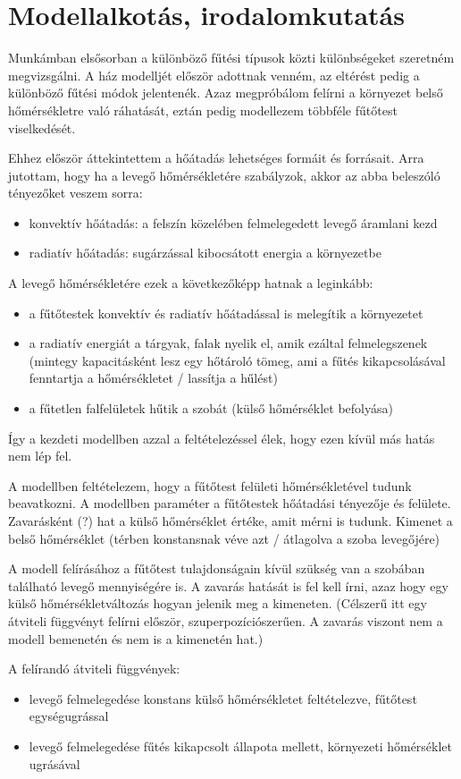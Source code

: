 \section{Modellalkotás, irodalomkutatás}

Munkámban elsősorban a különböző fűtési típusok közti különbségeket szeretném megvizsgálni. A ház modelljét először adottnak venném, az eltérést pedig a különböző fűtési módok jelentenék.
Azaz megpróbálom felírni a környezet belső hőmérsékletre való ráhatását, eztán pedig modellezem többféle fűtőtest viselkedését.

Ehhez először áttekintettem a hőátadás lehetséges formáit és forrásait. Arra jutottam, hogy ha a levegő hőmérsékletére szabályzok, akkor az abba beleszóló tényezőket veszem sorra:
\begin{itemize}[noitemsep,topsep=0pt,parsep=0pt,partopsep=0pt]
	\item konvektív hőátadás: a felszín közelében felmelegedett levegő áramlani kezd
	\item radiatív hőátadás: sugárzással kibocsátott energia a környezetbe
\end{itemize}


A levegő hőmérsékletére ezek a következőképp hatnak a leginkább:
\begin{itemize}[noitemsep,topsep=0pt,parsep=0pt,partopsep=0pt]
	\item a fűtőtestek konvektív és radiatív hőátadással is melegítik a környezetet
	\item a radiatív energiát a tárgyak, falak nyelik el, amik ezáltal felmelegszenek (mintegy kapacitásként lesz egy hőtároló tömeg, ami a fűtés kikapcsolásával fenntartja a hőmérsékletet / lassítja a hűlést)
	\item a fűtetlen falfelületek hűtik a szobát (külső hőmérséklet befolyása)
\end{itemize}

Így a kezdeti modellben azzal a feltételezéssel élek, hogy ezen kívül más hatás nem lép fel.

A modellben feltételezem, hogy a fűtőtest felületi hőmérsékletével tudunk beavatkozni. A modellben paraméter a fűtőtestek hőátadási tényezője és felülete. Zavarásként (?) hat a külső hőmérséklet értéke, amit mérni is tudunk. Kimenet a belső hőmérséklet (térben konstansnak véve azt / átlagolva a szoba levegőjére)

A modell felírásához a fűtőtest tulajdonságain kívül szükség van a szobában található levegő mennyiségére is. A zavarás hatását is fel kell írni, azaz hogy egy külső hőmérsékletváltozás hogyan jelenik meg a kimeneten. (Célszerű itt egy átviteli függvényt felírni először, szuperpozíciószerűen. A zavarás viszont nem a modell bemenetén és nem is a kimenetén hat.)

A felírandó átviteli függvények:

\begin{itemize}[noitemsep,topsep=0pt,parsep=0pt,partopsep=0pt]
	\item levegő felmelegedése konstans külső hőmérsékletet feltételezve, fűtőtest egységugrással
	\item levegő felmelegedése fűtés kikapcsolt állapota mellett, környezeti hőmérséklet ugrásával
\end{itemize}

